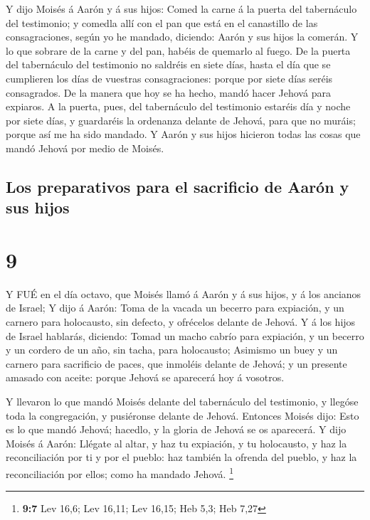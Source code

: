  Y dijo Moisés á Aarón y á sus hijos: Comed la carne á la
puerta del tabernáculo del testimonio; y comedla allí con el pan que
está en el canastillo de las consagraciones, según yo he mandado,
diciendo: Aarón y sus hijos la comerán.  Y lo que sobrare
de la carne y del pan, habéis de quemarlo al fuego.  De la
puerta del tabernáculo del testimonio no saldréis en siete días, hasta
el día que se cumplieren los días de vuestras consagraciones: porque por
siete días seréis consagrados.  De la manera que hoy se ha
hecho, mandó hacer Jehová para expiaros.  A la puerta,
pues, del tabernáculo del testimonio estaréis día y noche por siete
días, y guardaréis la ordenanza delante de Jehová, para que no muráis;
porque así me ha sido mandado.  Y Aarón y sus hijos
hicieron todas las cosas que mandó Jehová por medio de Moisés.

\hypertarget{los-preparativos-para-el-sacrificio-de-aaruxf3n-y-sus-hijos}{%
\subsection{Los preparativos para el sacrificio de Aarón y sus
hijos}\label{los-preparativos-para-el-sacrificio-de-aaruxf3n-y-sus-hijos}}

\hypertarget{section-8}{%
\section{9}\label{section-8}}

 Y FUÉ en el día octavo, que Moisés llamó á Aarón y á sus
hijos, y á los ancianos de Israel;  Y dijo á Aarón: Toma de
la vacada un becerro para expiación, y un carnero para holocausto, sin
defecto, y ofrécelos delante de Jehová.  Y á los hijos de
Israel hablarás, diciendo: Tomad un macho cabrío para expiación, y un
becerro y un cordero de un año, sin tacha, para holocausto; 
Asimismo un buey y un carnero para sacrificio de paces, que inmoléis
delante de Jehová; y un presente amasado con aceite: porque Jehová se
aparecerá hoy á vosotros.

 Y llevaron lo que mandó Moisés delante del tabernáculo del
testimonio, y llegóse toda la congregación, y pusiéronse delante de
Jehová.  Entonces Moisés dijo: Esto es lo que mandó Jehová;
hacedlo, y la gloria de Jehová se os aparecerá.  Y dijo
Moisés á Aarón: Llégate al altar, y haz tu expiación, y tu holocausto, y
haz la reconciliación por ti y por el pueblo: haz también la ofrenda del
pueblo, y haz la reconciliación por ellos; como ha mandado Jehová.
\footnote{\textbf{9:7} Lev 16,6; Lev 16,11; Lev 16,15; Heb 5,3; Heb 7,27}


